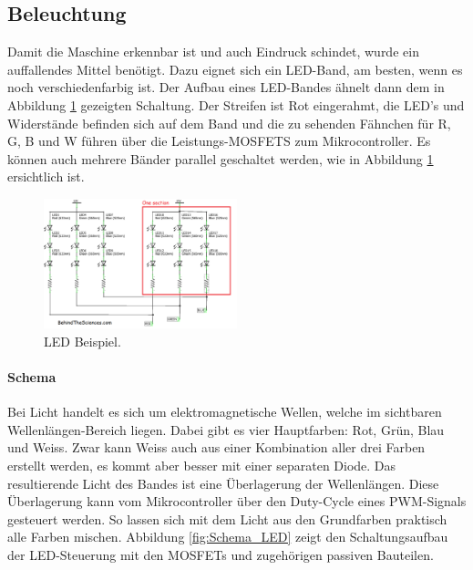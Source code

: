 \subsection{Beleuchtung}
\label{subsec:Beleuchtung_2}

Damit die Maschine erkennbar ist und auch Eindruck schindet, wurde ein auffallendes Mittel benötigt. Dazu eignet sich ein LED-Band, am besten, wenn es noch verschiedenfarbig ist. Der Aufbau eines LED-Bandes ähnelt dann dem in Abbildung \ref{fig:LED1} gezeigten Schaltung. Der Streifen ist Rot eingerahmt, die LED's und Widerstände befinden sich auf dem Band und die zu sehenden Fähnchen für R, G, B und W führen über die Leistungs-MOSFETS zum Mikrocontroller. Es können auch mehrere Bänder parallel geschaltet werden, wie in Abbildung \ref{fig:LED1} ersichtlich ist.

\begin{figure}[H]
\center
\includegraphics[width = 0.5\textwidth]{graphics/Schema_LED1}
\caption{LED Beispiel. \cite{behindthesciences_rgb_2017}}
\label{fig:LED1}
\end{figure}

\paragraph{Schema}\mbox{}

Bei Licht handelt es sich um elektromagnetische Wellen, welche im sichtbaren Wellenlängen-Bereich liegen. Dabei gibt es vier Hauptfarben: Rot, Grün, Blau und Weiss. Zwar kann Weiss auch aus einer Kombination aller drei Farben erstellt werden, es kommt aber besser mit einer separaten Diode. Das resultierende Licht des Bandes ist eine Überlagerung der Wellenlängen. Diese Überlagerung kann vom Mikrocontroller über den Duty-Cycle eines PWM-Signals gesteuert werden. So lassen sich mit dem Licht aus den Grundfarben praktisch alle Farben mischen. Abbildung \ref{fig:Schema_LED} zeigt den Schaltungsaufbau der LED-Steuerung mit den MOSFETs und zugehörigen passiven Bauteilen.

